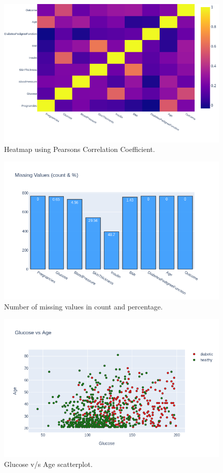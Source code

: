 \documentclass[12pt]{article}
\begin{document}
\begin{figure}[ht]
\centering
\includegraphics[width=1\textwidth]{4a.png}
\caption{\label{fig:11} Heatmap using Pearsons Correlation Coefficient.}
\end{figure}

\begin{figure}[ht]
\centering
\includegraphics[width=1\textwidth]{4.png}
\caption{\label{fig:12} Number of missing values in count and percentage.}
\end{figure}

\begin{figure}[ht]
\centering
\includegraphics[width=1\textwidth]{5.png}
\caption{\label{fig:13} Glucose v/s Age scatterplot.}
\end{figure}
\end{document}

